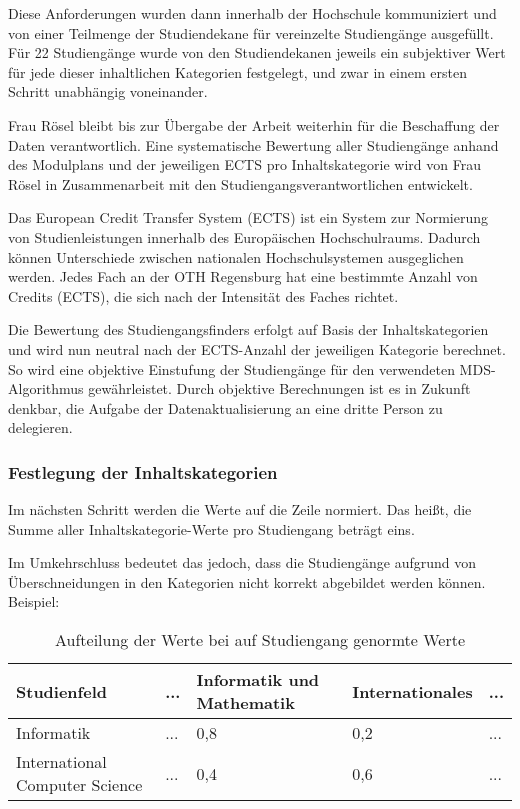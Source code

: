 Diese Anforderungen wurden dann innerhalb der Hochschule kommuniziert und von einer Teilmenge der Studiendekane für vereinzelte Studiengänge ausgefüllt. Für 22 Studiengänge wurde von den Studiendekanen jeweils ein subjektiver Wert für jede dieser inhaltlichen Kategorien festgelegt, und zwar in einem ersten Schritt unabhängig voneinander. %

Frau Rösel bleibt bis zur Übergabe der Arbeit weiterhin für die Beschaffung der Daten verantwortlich. Eine systematische Bewertung aller Studiengänge anhand des Modulplans und der jeweiligen ECTS pro Inhaltskategorie wird von Frau Rösel in Zusammenarbeit mit den Studiengangsverantwortlichen entwickelt.

Das European Credit Transfer System (ECTS) ist ein System zur Normierung von Studienleistungen innerhalb des Europäischen Hochschulraums. Dadurch können Unterschiede zwischen nationalen Hochschulsystemen ausgeglichen werden. \parencite{european_commission_europaisches_nodate} Jedes Fach an der OTH Regensburg hat eine bestimmte Anzahl von Credits (ECTS), die sich nach der Intensität des Faches richtet.

Die Bewertung des Studiengangsfinders erfolgt auf Basis der Inhaltskategorien und wird nun neutral nach der ECTS-Anzahl der jeweiligen Kategorie berechnet. So wird eine objektive Einstufung der Studiengänge für den verwendeten MDS-Algorithmus gewährleistet. Durch objektive Berechnungen ist es in Zukunft denkbar, die Aufgabe der Datenaktualisierung an eine dritte Person zu delegieren.

\subsubsection{Festlegung der Inhaltskategorien}
Im nächsten Schritt werden die Werte auf die Zeile normiert. Das heißt, die
Summe aller Inhaltskategorie-Werte pro Studiengang beträgt eins.

Im Umkehrschluss bedeutet das jedoch, dass die Studiengänge aufgrund von
Überschneidungen in den Kategorien nicht korrekt abgebildet werden können.
Beispiel:

\begin{table}[!ht]
    \centering
    \begin{tabular}{|l|l|l|l|l|}
    \hline
    \textbf{Studienfeld}           & \textbf{...} & \textbf{Informatik und Mathematik} & \textbf{Internationales} & \textbf{...} \\ \hline
    Informatik                     & ...          & 0,8                                & 0,2                      & ...          \\ \hline
    International Computer Science & ...          & 0,4                                & 0,6                      & ...          \\ \hline
    \end{tabular}

    \caption{Aufteilung der Werte bei auf Studiengang genormte Werte}
    \label{table:norm-values}
\end{table}

